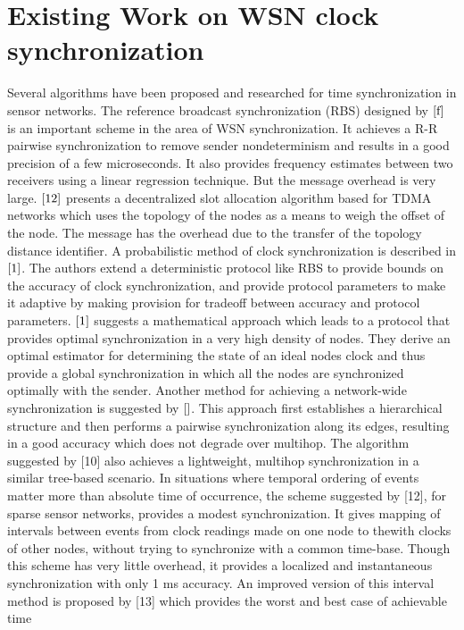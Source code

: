 \documentclass[a4paper,8pt]{report}
\begin{document}
\section{Existing Work on WSN clock synchronization}
      Several algorithms have been proposed and researched for time synchronization in
sensor networks.
      The reference broadcast synchronization (RBS) designed by $\ref{f}$ is an important
scheme in the area of WSN synchronization. It achieves a R-R
pairwise synchronization to remove sender nondeterminism and results
in a good precision of a few microseconds. It also provides
frequency estimates between two receivers using a linear regression
technique. But the message overhead is very large. $\cite{12}$
presents a decentralized slot allocation algorithm based for TDMA
networks which uses the topology of the nodes as a means to weigh
the offset of the node. The message has the overhead due to the
transfer of the topology distance identifier.
      A probabilistic method of clock synchronization is described in $\cite{1}$. The authors
extend a deterministic protocol like RBS to provide bounds on the
accuracy of clock synchronization, and provide protocol parameters
to make it adaptive by making provision for tradeoff between
accuracy and protocol parameters.
      $\cite{1}$ suggests a mathematical approach which leads to a protocol that provides optimal
       synchronization in a very high density of nodes. They derive an optimal estimator for
determining the state of an ideal nodes clock and thus provide a
global synchronization in which all the nodes are synchronized
optimally with the sender.
      Another method for achieving a network-wide synchronization is suggested by $\ref{}$.
This approach first establishes a hierarchical structure and then
performs a pairwise synchronization along its edges, resulting in a
good accuracy which does not degrade over multihop. The algorithm
suggested by [10] also achieves a lightweight, multihop
synchronization in a similar tree-based scenario.
      In situations where temporal ordering of events matter more than absolute time of
occurrence, the scheme suggested by [12], for sparse sensor
networks, provides a modest synchronization. It gives mapping of
intervals between events from clock readings made on one node to thewith
clocks of other nodes, without trying to synchronize with a common
time-base. Though this scheme has very little overhead, it provides
a localized and instantaneous synchronization with only 1 ms
accuracy. An improved version of this interval method is proposed by
[13] which provides the worst and best case of achievable time
\end{document}
